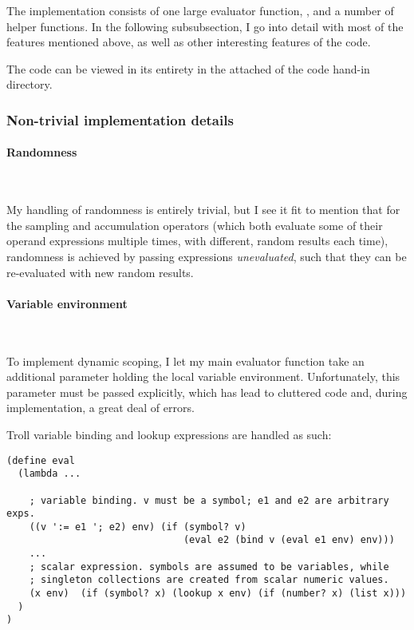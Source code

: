 The implementation consists of one large evaluator function, , and a
number of helper functions. In the following subsubsection, I go into detail
with most of the features mentioned above, as well as other interesting features
of the code.

\smallskip

The code can be viewed in its entirety in the attached  of the code
hand-in directory.

\subsubsection{Non-trivial implementation details}

\paragraph{Randomness}~\smallskip

My handling of randomness is entirely trivial, but I see it fit to mention that
for the sampling and accumulation operators (which both evaluate some of their
operand expressions multiple times, with different, random results each time),
randomness is achieved by passing expressions \emph{unevaluated}, such that they
can be re-evaluated with new random results.

\paragraph{Variable environment}~\smallskip

To implement dynamic scoping, I let my main evaluator function take an
additional parameter  holding the local variable environment.
Unfortunately, this parameter must be passed explicitly, which has lead to
cluttered code and, during implementation, a great deal of errors.

\smallskip

Troll variable binding and lookup expressions are handled as such:


\begin{verbatim}
(define eval
  (lambda ...

    ; variable binding. v must be a symbol; e1 and e2 are arbitrary exps.
    ((v ':= e1 '; e2) env) (if (symbol? v)
                               (eval e2 (bind v (eval e1 env) env)))
    ...
    ; scalar expression. symbols are assumed to be variables, while
    ; singleton collections are created from scalar numeric values.
    (x env)  (if (symbol? x) (lookup x env) (if (number? x) (list x)))
  )
)
\end{verbatim}

